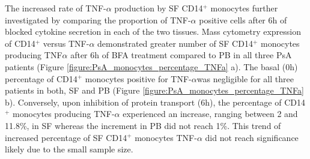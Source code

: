 The increased rate of TNF-$\alpha$ production by SF CD14$^+$ monocytes further investigated by comparing the proportion of TNF-$\alpha$ positive cells after 6h of blocked cytokine secretion in each of the two tissues. Mass cytometry expression of CD14$^+$ versus TNF-$\alpha$ demonstrated greater number of SF CD14$^+$ monocytes producing TNF$\alpha$ after 6h of BFA treatment compared to PB in all three PsA patients (Figure \ref{figure:PsA_monocytes_percentage_TNFa} a). The basal (0h) percentage of CD14$^+$ monocytes positive for TNF-$\alpha$was negligible for all three patients in both, SF and PB (Figure \ref{figure:PsA_monocytes_percentage_TNFa} b). Conversely, upon inhibition of protein transport (6h), the percentage of CD14$^+$ monocytes producing TNF-$\alpha$ experienced an increase, ranging between 2 and 11.8\%, in SF whereas the increment in PB did not reach 1\%. This trend of increased percentage of SF CD14$^+$ monocytes TNF-$\alpha$ did not reach significance likely due to the small sample size. 
 
